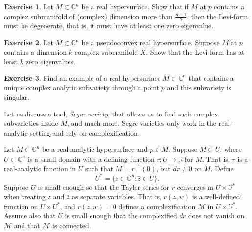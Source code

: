 \documentclass[12pt,openany]{book}
\newcommand{\C}{{\mathbb{C}}}
\newcommand{\R}{{\mathbb{R}}}
\newcommand{\sM}{{\mathcal{M}}}
\newcommand{\myindex}[1]{#1\index{#1}}
\theoremstyle{plain}
\theoremstyle{remark}
\theoremstyle{definition}
\newenvironment{exbox}{%
    \def\FrameCommand{\vrule width 1pt \relax\hspace {10pt}}%
    \MakeFramed {\advance \hsize -\width \FrameRestore }%
}{%
    \endMakeFramed
}
\theoremstyle{exercise}
\newtheorem{exercise}{Exercise}[section]
\theoremstyle{example}
\begin{document}
\begin{exbox}
\begin{exercise}
Let $M \subset \C^n$ be a real hypersurface.
Show that if $M$ at $p$ contains a complex submanifold of (complex)
dimension more than
$\frac{n-1}{2}$, then the Levi-form must be degenerate, that is, it must
have at least one zero eigenvalue.
\end{exercise}

\begin{exercise}
Let $M \subset \C^n$ be a pseudoconvex real hypersurface.
Suppose $M$ at $p$ contains a dimension $k$ complex submanifold $X$.
Show that the Levi-form has at least $k$ zero eigenvalues.
\end{exercise}

\begin{exercise}
Find an example of a real hypersurface $M \subset \C^n$ that contains a unique complex
analytic subvariety through a point $p$ and this subvariety is singular.
\end{exercise}
\end{exbox}


Let us discuss a tool, \emph{\myindex{Segre variety}}, that allows us to
find such complex subvarieties inside $M$, and much more.  Segre varieties only
work in the real-analytic setting and rely on complexification.

Let $M \subset \C^n$ be a real-analytic hypersurface and $p \in M$.
Suppose $M \subset U$,
where $U \subset \C^n$ is a small domain with a defining function $r \colon
U  \to \R$ for $M$.  That is, $r$ is a real-analytic function in $U$ such that
$M = r^{-1}(0)$, but
$dr \not= 0$ on $M$.  Define
\begin{equation*}
U^* = \bigl\{ z \in \C^n : \bar{z} \in U \bigr\} .
\end{equation*}
Suppose $U$ is small enough so that the Taylor series for $r$
converges in $U \times U^*$ when treating $z$ and $\bar{z}$ as separate
variables.  That is, $r(z,w)$ is a well-defined function on
$U \times U^*$, and $r(z,w) = 0$ defines a complexification $\sM$
in $U \times U^*$.  Assume also that $U$ is small enough that
the complexified
$dr$ does not vanish on $\sM$ and that $\sM$ is connected.
\end{document}
